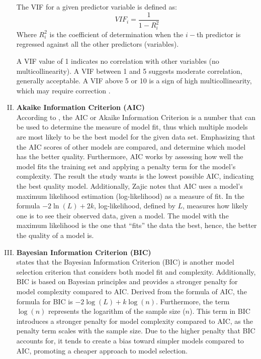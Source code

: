 \documentclass[11pt]{article}
\begin{document}
\begin{enumerate}[I. ]
    The VIF for a given predictor variable is defined as:
    $$
        VIF_{i} = \frac {1}{1 - R^{2}_{i}}   
    $$
    Where $R_{i}^{2}$ is the coefficient of determination when the $i-$th predictor is regressed against all the other predictors (variables). 

    A VIF value of 1 indicates no correlation with other variables (no multicollinearity). A VIF between 1 and 5 suggests moderate correlation, generally acceptable. A VIF above 5 or 10 is a sign of high multicollinearity, which may require correction \citep{vif2}.

    \item \textbf{Akaike Information Criterion (AIC)}\\
    According to \citet{zajic}, the AIC or Akaike Information Criterion is a number that can be used to determine the measure of model fit, thus which multiple models are most likely to be the best model for the given data set. Emphasizing that the AIC scores of other models are compared, and determine which model has the better quality. Furthermore, AIC works by assessing how well the model fits the training set and applying a penalty term for the model’s complexity. The result the study wants is the lowest possible AIC, indicating the best quality model. Additionally, Zajic notes that AIC uses a model’s maximum likelihood estimation (log-likelihood) as a measure of fit. In the formula $-2\ln(L)+2k$, log-likelihood, defined by $L$, measures how likely one is to see their observed data, given a model. The model with the maximum likelihood is the one that “fits” the data the best, hence, the better the quality of a model is.

    \item \textbf{Bayesian Information Criterion (BIC)}\\
    \citet{kumar} states that the Bayesian Information Criterion (BIC) is another model selection criterion that considers both model fit and complexity. Additionally, BIC is based on Bayesian principles and provides a stronger penalty for model complexity compared to AIC. Derived from the formula of AIC, the formula for BIC is $-2\log(L)+k\log(n)$. Furthermore, the term $\log (n)$ represents the logarithm of the sample size ($n$). This term in BIC introduces a stronger penalty for model complexity compared to AIC, as the penalty term scales with the sample size. Due to the higher penalty that BIC accounts for, it tends to create a bias toward simpler models compared to AIC, promoting a cheaper approach to model selection.

\end{enumerate}
\end{document}
